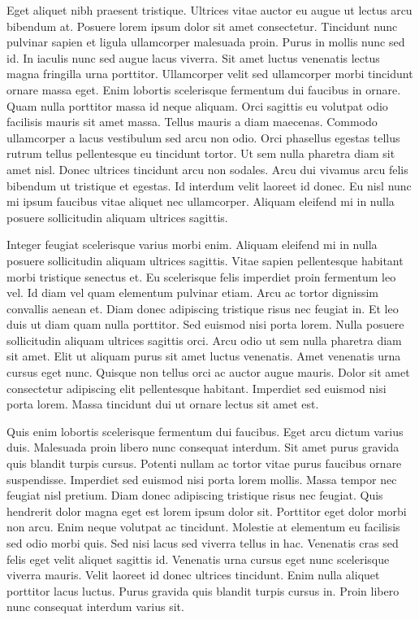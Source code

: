 \documentclass[11pt,a4paper]{article}
\begin{document}
Eget aliquet nibh praesent tristique. Ultrices vitae auctor eu augue ut lectus arcu bibendum at. Posuere lorem ipsum dolor sit amet consectetur. Tincidunt nunc pulvinar sapien et ligula ullamcorper malesuada proin. Purus in mollis nunc sed id. In iaculis nunc sed augue lacus viverra. Sit amet luctus venenatis lectus magna fringilla urna porttitor. Ullamcorper velit sed ullamcorper morbi tincidunt ornare massa eget. Enim lobortis scelerisque fermentum dui faucibus in ornare. Quam nulla porttitor massa id neque aliquam. Orci sagittis eu volutpat odio facilisis mauris sit amet massa. Tellus mauris a diam maecenas. Commodo ullamcorper a lacus vestibulum sed arcu non odio. Orci phasellus egestas tellus rutrum tellus pellentesque eu tincidunt tortor. Ut sem nulla pharetra diam sit amet nisl. Donec ultrices tincidunt arcu non sodales. Arcu dui vivamus arcu felis bibendum ut tristique et egestas. Id interdum velit laoreet id donec. Eu nisl nunc mi ipsum faucibus vitae aliquet nec ullamcorper. Aliquam eleifend mi in nulla posuere sollicitudin aliquam ultrices sagittis.

Integer feugiat scelerisque varius morbi enim. Aliquam eleifend mi in nulla posuere sollicitudin aliquam ultrices sagittis. Vitae sapien pellentesque habitant morbi tristique senectus et. Eu scelerisque felis imperdiet proin fermentum leo vel. Id diam vel quam elementum pulvinar etiam. Arcu ac tortor dignissim convallis aenean et. Diam donec adipiscing tristique risus nec feugiat in. Et leo duis ut diam quam nulla porttitor. Sed euismod nisi porta lorem. Nulla posuere sollicitudin aliquam ultrices sagittis orci. Arcu odio ut sem nulla pharetra diam sit amet. Elit ut aliquam purus sit amet luctus venenatis. Amet venenatis urna cursus eget nunc. Quisque non tellus orci ac auctor augue mauris. Dolor sit amet consectetur adipiscing elit pellentesque habitant. Imperdiet sed euismod nisi porta lorem. Massa tincidunt dui ut ornare lectus sit amet est.

Quis enim lobortis scelerisque fermentum dui faucibus. Eget arcu dictum varius duis. Malesuada proin libero nunc consequat interdum. Sit amet purus gravida quis blandit turpis cursus. Potenti nullam ac tortor vitae purus faucibus ornare suspendisse. Imperdiet sed euismod nisi porta lorem mollis. Massa tempor nec feugiat nisl pretium. Diam donec adipiscing tristique risus nec feugiat. Quis hendrerit dolor magna eget est lorem ipsum dolor sit. Porttitor eget dolor morbi non arcu. Enim neque volutpat ac tincidunt. Molestie at elementum eu facilisis sed odio morbi quis. Sed nisi lacus sed viverra tellus in hac. Venenatis cras sed felis eget velit aliquet sagittis id. Venenatis urna cursus eget nunc scelerisque viverra mauris. Velit laoreet id donec ultrices tincidunt. Enim nulla aliquet porttitor lacus luctus. Purus gravida quis blandit turpis cursus in. Proin libero nunc consequat interdum varius sit.
\end{document}
